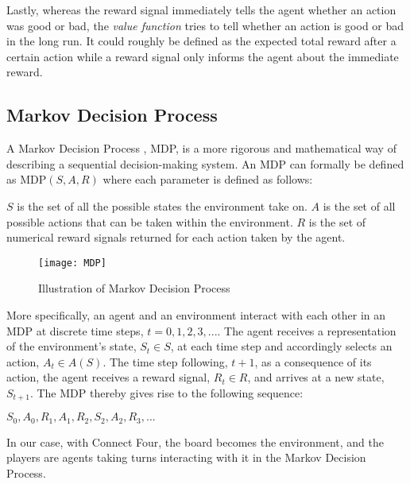 \documentclass[titlepage]{article}
\begin{document}
\noindent
Lastly, whereas the reward signal immediately tells the agent whether an action was good or bad, the \emph{value function} \cite{sutton} tries to tell whether an action is good or bad in the long run. It could roughly be defined as the expected total reward after a certain action while a reward signal only informs the agent about the immediate reward. 

\subsection{Markov Decision Process}

\vskip 0.2cm

A Markov Decision Process \cite{sutton}, MDP, is a more rigorous and mathematical way of describing a sequential decision-making system. An MDP can formally be defined as MDP$(S, A, R)$ where each parameter is defined as follows:

\newpage

\begin{outline}
    \1 $S$ is the set of all the possible states the environment take on.
    \1 $A$ is the set of all possible actions that can be taken within the environment.
    \1 $R$ is the set of numerical reward signals returned for each action taken by the agent.
\end{outline}

\begin{figure}[h]
    \centering
    \texttt{[image: MDP]}
    \caption{Illustration of Markov Decision Process}
\end{figure}

\noindent
More specifically, an agent and an environment interact with each other in an MDP at discrete time steps, $t = 0, 1, 2, 3, ...$. The agent receives a representation of the environment's state, $S_{t} \in S$, at each time step and accordingly selects an action, $A_{t} \in A(S)$. The time step following, $t + 1$, as a consequence of its action, the agent receives a reward signal, $R_{t} \in R$, and arrives at a new state, $S_{t+1}$. The MDP thereby gives rise to the following sequence: 

\vskip 0.3cm

\centerline{$S_{0}, A_{0}, R_{1}, A_{1}, R_{2}, S_{2}, A_{2}, R_{3}, ...$}

\vskip 0.3cm

\noindent
In our case, with Connect Four, the board becomes the environment, and the players are agents taking turns interacting with it in the Markov Decision Process.
\end{document}

